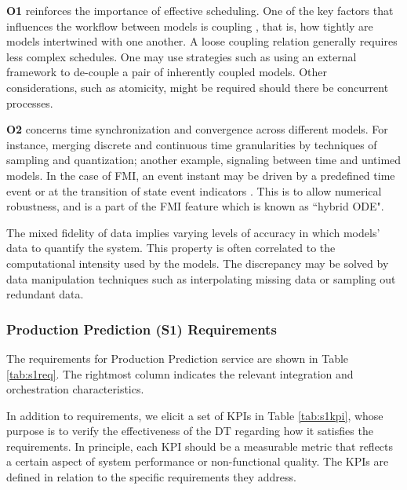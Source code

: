 \newpage
\textbf{O1} reinforces the importance of effective scheduling. One of the key factors that influences the workflow between models is coupling \cite{Karolius2018}, that is, how tightly are models intertwined with one another. A loose coupling relation generally requires less complex schedules. One may use strategies such as using an external framework to de-couple a pair of inherently coupled models. Other considerations, such as atomicity, might be required should there be concurrent processes.

\textbf{O2} concerns time synchronization and convergence across different models. For instance, merging discrete and continuous time granularities by techniques of sampling and quantization; another example, signaling between time and untimed models. In the case of FMI, an event instant may be driven by a predefined time event or at the transition of state event indicators \cite{Blochwitz2011}. This is to allow numerical robustness, and is a part of the FMI feature which is known as ``hybrid ODE".

The mixed fidelity of data implies varying levels of accuracy in which models' data to quantify the system. This property is often correlated to the computational intensity used by the models. The discrepancy may be solved by data manipulation techniques such as interpolating missing data or sampling out redundant data.

\subsubsection{Production Prediction (S1) Requirements}
The requirements for Production Prediction service are shown in Table \ref{tab:s1req}. The rightmost column indicates the relevant integration and orchestration characteristics.

In addition to requirements, we elicit a set of KPIs in Table \ref{tab:s1kpi}, whose purpose is to verify the effectiveness of the DT regarding how it satisfies the requirements. In principle, each KPI should be a measurable metric that reflects a certain aspect of system performance or non-functional quality. The KPIs are defined in relation to the specific requirements they address.

